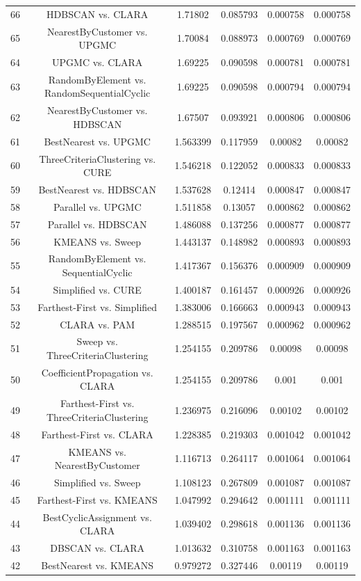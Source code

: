 \documentclass[a4paper,10pt]{article}
\begin{document}
\begin{landscape}
\begin{table}[!htp]
\begin{tabular}{cccccc}
66&HDBSCAN vs. CLARA&1.71802&0.085793&0.000758&0.000758\\
65&NearestByCustomer vs. UPGMC&1.70084&0.088973&0.000769&0.000769\\
64&UPGMC vs. CLARA&1.69225&0.090598&0.000781&0.000781\\
63&RandomByElement vs. RandomSequentialCyclic&1.69225&0.090598&0.000794&0.000794\\
62&NearestByCustomer vs. HDBSCAN&1.67507&0.093921&0.000806&0.000806\\
61&BestNearest vs. UPGMC&1.563399&0.117959&0.00082&0.00082\\
60&ThreeCriteriaClustering vs. CURE&1.546218&0.122052&0.000833&0.000833\\
59&BestNearest vs. HDBSCAN&1.537628&0.12414&0.000847&0.000847\\
58&Parallel vs. UPGMC&1.511858&0.13057&0.000862&0.000862\\
57&Parallel vs. HDBSCAN&1.486088&0.137256&0.000877&0.000877\\
56&KMEANS vs. Sweep&1.443137&0.148982&0.000893&0.000893\\
55&RandomByElement vs. SequentialCyclic&1.417367&0.156376&0.000909&0.000909\\
54&Simplified vs. CURE&1.400187&0.161457&0.000926&0.000926\\
53&Farthest-First vs. Simplified&1.383006&0.166663&0.000943&0.000943\\
52&CLARA vs. PAM&1.288515&0.197567&0.000962&0.000962\\
51&Sweep vs. ThreeCriteriaClustering&1.254155&0.209786&0.00098&0.00098\\
50&CoefficientPropagation vs. CLARA&1.254155&0.209786&0.001&0.001\\
49&Farthest-First vs. ThreeCriteriaClustering&1.236975&0.216096&0.00102&0.00102\\
48&Farthest-First vs. CLARA&1.228385&0.219303&0.001042&0.001042\\
47&KMEANS vs. NearestByCustomer&1.116713&0.264117&0.001064&0.001064\\
46&Simplified vs. Sweep&1.108123&0.267809&0.001087&0.001087\\
45&Farthest-First vs. KMEANS&1.047992&0.294642&0.001111&0.001111\\
44&BestCyclicAssignment vs. CLARA&1.039402&0.298618&0.001136&0.001136\\
43&DBSCAN vs. CLARA&1.013632&0.310758&0.001163&0.001163\\
42&BestNearest vs. KMEANS&0.979272&0.327446&0.00119&0.00119\\

\end{tabular}
\end{table}
\end{landscape}
\end{document}
